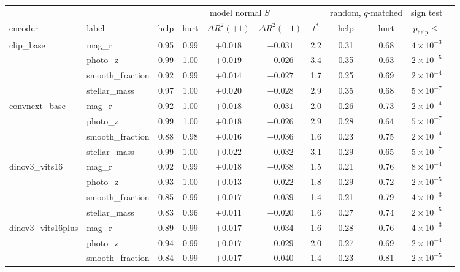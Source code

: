 \begin{table}[t]
\centering\footnotesize\setlength{\tabcolsep}{3pt}
\begin{tabular}{llccccccccc}
\toprule
 & & \multicolumn{5}{c}{model normal $S$} & \multicolumn{2}{c}{random, $q$-matched} & sign test \\
encoder & label & help & hurt & $\Delta R^2(+1)$ & $\Delta R^2(-1)$ & $t^{*}$ & help & hurt & $p_{\mathrm{help}}\le$ \\
\midrule
clip\_base & mag\_r & 0.95 & 0.99 & $+0.018$ & $-0.031$ & 2.2 & 0.31 & 0.68 & $4\times 10^{-3}$ \\
 & photo\_z & 0.99 & 1.00 & $+0.019$ & $-0.026$ & 3.4 & 0.35 & 0.63 & $2\times 10^{-5}$ \\
 & smooth\_fraction & 0.92 & 0.99 & $+0.014$ & $-0.027$ & 1.7 & 0.25 & 0.69 & $2\times 10^{-4}$ \\
 & stellar\_mass & 0.97 & 1.00 & $+0.020$ & $-0.028$ & 2.9 & 0.35 & 0.68 & $5\times 10^{-7}$ \\
\addlinespace[2pt]
convnext\_base & mag\_r & 0.92 & 1.00 & $+0.018$ & $-0.031$ & 2.0 & 0.26 & 0.73 & $2\times 10^{-4}$ \\
 & photo\_z & 0.99 & 1.00 & $+0.018$ & $-0.026$ & 2.9 & 0.28 & 0.64 & $5\times 10^{-7}$ \\
 & smooth\_fraction & 0.88 & 0.98 & $+0.016$ & $-0.036$ & 1.6 & 0.23 & 0.75 & $2\times 10^{-4}$ \\
 & stellar\_mass & 0.99 & 1.00 & $+0.022$ & $-0.032$ & 3.1 & 0.29 & 0.65 & $5\times 10^{-7}$ \\
\addlinespace[2pt]
dinov3\_vits16 & mag\_r & 0.92 & 0.99 & $+0.018$ & $-0.038$ & 1.5 & 0.21 & 0.76 & $8\times 10^{-4}$ \\
 & photo\_z & 0.93 & 1.00 & $+0.013$ & $-0.022$ & 1.8 & 0.29 & 0.72 & $2\times 10^{-5}$ \\
 & smooth\_fraction & 0.85 & 0.99 & $+0.017$ & $-0.039$ & 1.4 & 0.21 & 0.79 & $4\times 10^{-3}$ \\
 & stellar\_mass & 0.83 & 0.96 & $+0.011$ & $-0.020$ & 1.6 & 0.27 & 0.74 & $2\times 10^{-5}$ \\
\addlinespace[2pt]
dinov3\_vits16plus & mag\_r & 0.89 & 0.99 & $+0.017$ & $-0.034$ & 1.6 & 0.28 & 0.76 & $4\times 10^{-3}$ \\
 & photo\_z & 0.94 & 0.99 & $+0.017$ & $-0.029$ & 2.0 & 0.27 & 0.69 & $2\times 10^{-4}$ \\
 & smooth\_fraction & 0.84 & 0.99 & $+0.017$ & $-0.040$ & 1.4 & 0.23 & 0.81 & $2\times 10^{-5}$ \\

\end{tabular}
\end{table}

